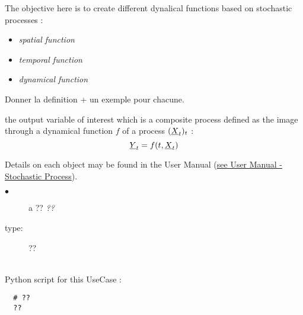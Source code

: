 \renewcommand{\filename}{docUC_StocProc_DynamicalFunction.tex}
\renewcommand{\filetitle}{UC : Creation of a Dynamical Function}

\HeaderIIILevel

\label{UCprocess}




The objective here is to create different dynalical functions based on stochastic processes : 
\begin {itemize}
 \item {\itshape spatial function}
 \item {\itshape temporal function}
 \item {\itshape dynamical function}
\end{itemize}

Donner la definition + un exemple pour chacune.

the output variable of interest which is a  composite process defined as the image through a dynamical function $f$ of a process $({\underline{X}}_t)_t$ : 
\begin{equation} 
{\underline{Y}}_t = f(t,{\underline{X}}_t)
\end{equation}


Details on each object may be found in the User Manual  (\href{OpenTURNS_UserManual_TUI.pdf}{see User Manual - Stochastic Process}).\\

{
  \begin{description}
  \item[$\bullet$] a ?? {\itshape ??}
  \item[type:]  ??
  \end{description}

}

\textspace\\
Python script for this UseCase :

\begin{lstlisting}
  # ??
  ??
\end{lstlisting}
